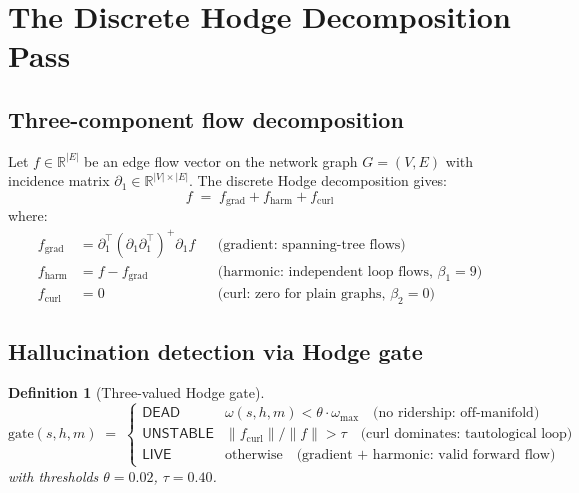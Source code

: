 \documentclass[11pt,a4paper]{article}
\newtheorem{definition}[theorem]{Definition}
\begin{document}
\section{The Discrete Hodge Decomposition Pass}

\subsection{Three-component flow decomposition}

Let $f \in \mathbb{R}^{|E|}$ be an edge flow vector on the network
graph $G = (V,E)$ with incidence matrix
$\partial_1 \in \mathbb{R}^{|V| \times |E|}$.
The discrete Hodge decomposition gives:
\[
  f \;=\; f_{\mathrm{grad}} + f_{\mathrm{harm}} + f_{\mathrm{curl}}
\]
where:
\begin{align*}
  f_{\mathrm{grad}} &= \partial_1^\top (\partial_1 \partial_1^\top)^+ \partial_1 f
    & &\text{(gradient: spanning-tree flows)} \\
  f_{\mathrm{harm}} &= f - f_{\mathrm{grad}}
    & &\text{(harmonic: independent loop flows, } \beta_1=9\text{)} \\
  f_{\mathrm{curl}} &= 0
    & &\text{(curl: zero for plain graphs, } \beta_2=0\text{)}
\end{align*}

\subsection{Hallucination detection via Hodge gate}

\begin{definition}[Three-valued Hodge gate]
\[
  \mathrm{gate}(s,h,m) \;=\;
  \begin{cases}
    \mathsf{DEAD}     & \omega(s,h,m) < \theta \cdot \omega_{\max}
                        \quad\text{(no ridership: off-manifold)} \\
    \mathsf{UNSTABLE} & \|f_{\mathrm{curl}}\|/\|f\| > \tau
                        \quad\text{(curl dominates: tautological loop)} \\
    \mathsf{LIVE}     & \text{otherwise}
                        \quad\text{(gradient + harmonic: valid forward flow)}
  \end{cases}
\]
with thresholds $\theta = 0.02$, $\tau = 0.40$.
\end{definition}
\end{document}
